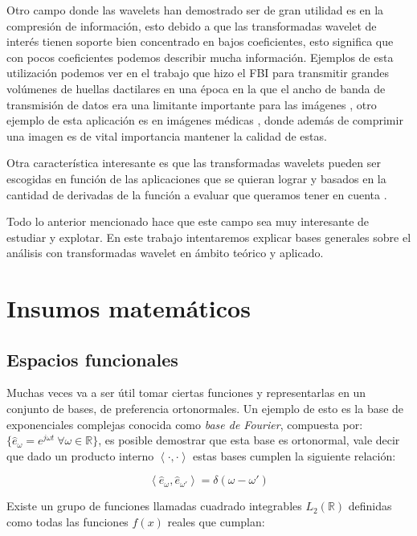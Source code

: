 \documentclass[conference]{IEEEtran}
\begin{document}
Otro campo donde las wavelets han demostrado ser de gran utilidad es en la compresión de información, esto debido a que las transformadas wavelet de interés tienen soporte bien concentrado en bajos coeficientes\cite{waveletsandsubbandcoding}, esto significa que con pocos coeficientes podemos describir mucha información. Ejemplos de esta utilización podemos ver en el trabajo que hizo el FBI para transmitir grandes volúmenes de huellas dactilares en una época en la que el ancho de banda de transmisión de datos era una limitante importante para las imágenes   \cite{fbi}, otro ejemplo de esta aplicación es en imágenes médicas   \cite{medical}, donde además de comprimir una imagen es de vital importancia mantener la calidad de estas.

Otra característica interesante es que las transformadas wavelets pueden ser escogidas en función de las aplicaciones que se quieran lograr y basados en la cantidad de derivadas de la función a evaluar que queramos tener en cuenta   \cite{wavelettour}.

Todo lo anterior mencionado hace que este campo sea muy interesante de estudiar y explotar. En este trabajo intentaremos explicar bases generales sobre el análisis con transformadas wavelet en ámbito teórico y aplicado.

\section{Insumos matemáticos}

\subsection{Espacios funcionales}

Muchas veces va a ser útil tomar ciertas funciones y representarlas en un conjunto de bases, de preferencia ortonormales. Un ejemplo de esto es la base de exponenciales complejas conocida como \emph{base de Fourier}, compuesta por: $\{\hat{e}_\omega = e^{j\omega t}\ \forall \omega  \in \mathds{R} \}$, es posible demostrar que esta base es ortonormal, vale decir que dado un producto interno $\left< \cdot, \cdot\right>$ estas bases cumplen la siguiente relación:

\begin{equation*}
  \left< \hat{e}_\omega, \hat{e}_{\omega'} \right> = \delta(\omega-\omega')
\end{equation*}

Existe un grupo de funciones llamadas cuadrado integrables $L_2(\mathds{R})$ definidas como todas las funciones $f(x)$ reales que cumplan:
\end{document}
